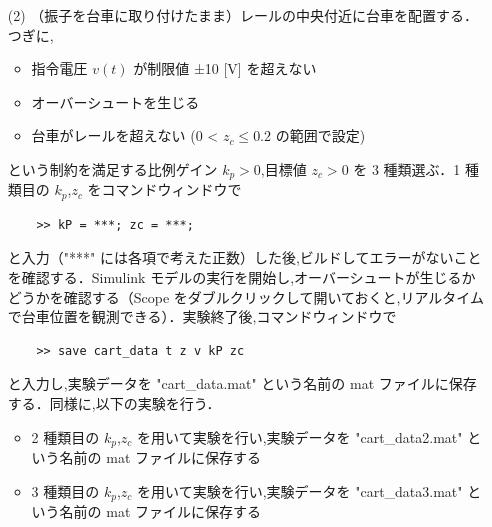 \begin{enumerate}
  \item[(2)] （振子を台車に取り付けたまま）レールの中央付近に台車を配置する．つぎに,
    \begin{itemize}
      \item 指令電圧 \( v(t) \) が制限値 ±10 [V] を超えない
      \item オーバーシュートを生じる
      \item 台車がレールを超えない (0 < \( z_c \leq 0.2 \) の範囲で設定)
    \end{itemize}
    という制約を満足する比例ゲイン \( k_p > 0 \),目標値 \( z_c > 0 \) を 3 種類選ぶ．1 種類目の \( k_p \),\( z_c \) をコマンドウィンドウで
    \begin{tcolorbox}[colback=gray!5!white,colframe=gray!75!black]
      \begin{lstlisting}
    >> kP = ***; zc = ***;
    \end{lstlisting}
    \end{tcolorbox}
    と入力（"***" には各項で考えた正数）した後,ビルドしてエラーがないことを確認する．Simulink モデルの実行を開始し,オーバーシュートが生じるかどうかを確認する（Scope をダブルクリックして開いておくと,リアルタイムで台車位置を観測できる）．実験終了後,コマンドウィンドウで
    \begin{tcolorbox}[colback=gray!5!white,colframe=gray!75!black]
      \begin{lstlisting}
    >> save cart_data t z v kP zc
    \end{lstlisting}
    \end{tcolorbox}
    と入力し,実験データを "cart\_data.mat" という名前の mat ファイルに保存する．同様に,以下の実験を行う．
    \begin{itemize}
      \item 2 種類目の \( k_p \),\( z_c \) を用いて実験を行い,実験データを "cart\_data2.mat" という名前の mat ファイルに保存する
      \item 3 種類目の \( k_p \),\( z_c \) を用いて実験を行い,実験データを "cart\_data3.mat" という名前の mat ファイルに保存する
    \end{itemize}
\end{enumerate}

